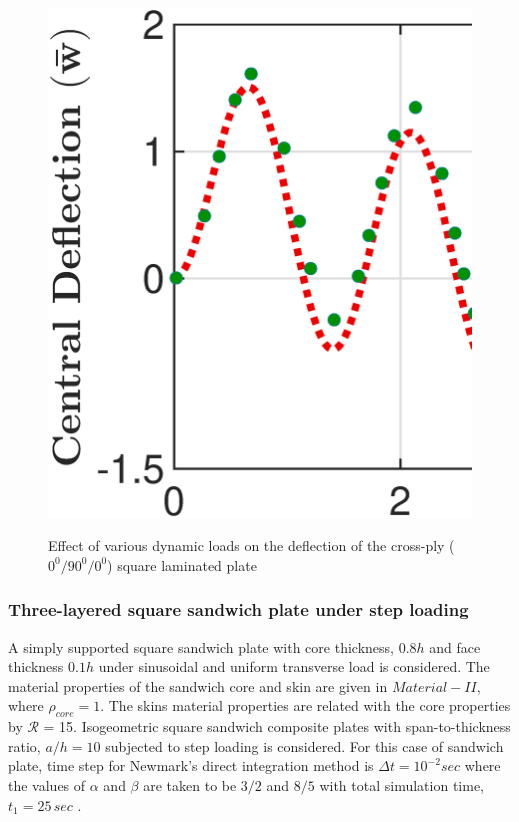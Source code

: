 \documentclass[3p,preprint,12pt]{elsarticle}
\begin{document}
\begin{figure}
\begin{minipage}{0.515\textwidth}
		\includegraphics[width=\linewidth]{Tran_Exp_NPSDT_Transient_h_By_a_1_5.eps}\\
	\end{minipage}
	\caption{Effect of various dynamic loads on the deflection of the cross-ply ($0^0/90^0/0^0$) square laminated plate}
	\label{fig:Transient_Tran}
\end{figure}

\subsubsection{Three-layered square sandwich plate under step loading}
A simply supported square sandwich plate with core thickness, $0.8h$ and face thickness $0.1h$ under sinusoidal and uniform transverse load is considered. The material properties of the sandwich core and skin are given in $Material-II$, where $\rho_{core}=1$. The skins material properties are related with the core properties by $\mathcal{R}$ = 15. Isogeometric square sandwich composite plates with span-to-thickness ratio, $a/h = 10$  subjected to step loading is considered. For this case of sandwich plate, time step for Newmark's direct integration method \cite{roque2011transient} is $\Delta t=10^{-2} sec$ where the values of $\alpha$ and $\beta$ are taken to be $3/2$ and $8/5$  with total simulation time, $t_{1}=25\,sec$ \cite{roque2011transient}.
\end{document}
